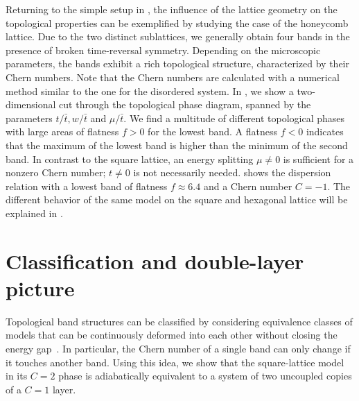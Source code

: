Returning to the simple setup in , the influence of the lattice geometry on the topological properties can be exemplified by studying the case of the honeycomb lattice.
Due to the two distinct sublattices, we generally obtain four bands in the presence of broken time-reversal symmetry.
Depending on the microscopic parameters, the bands exhibit a rich topological structure, characterized by their Chern numbers.
Note that the Chern numbers are calculated with a numerical method similar to the one for the disordered system.
In , we show a two-dimensional cut through the topological phase diagram, spanned by the parameters $t/\bar{t}, w/\bar{t}$ and $\mu/\bar{t}$.
We find a multitude of different topological phases with large areas of flatness $f > 0$ for the lowest band.
A flatness $f < 0$ indicates that the maximum of the lowest band is higher than the minimum of the second band.
In contrast to the square lattice, an energy splitting $\mu \ne 0$ is sufficient for a nonzero Chern number; $t\ne 0$ is not necessarily needed.
 shows the dispersion relation with a lowest band of flatness $f\approx 6.4$ and a Chern number $C=-1$.
The different behavior of the same model on the square and hexagonal lattice will be explained in .

\section{Classification and double-layer picture}


Topological band structures can be classified by considering equivalence classes of models that can be continuously deformed into each other without closing the energy gap~\cite{Hasan2010}.
In particular, the Chern number of a single band can only change if it touches another band.
Using this idea, we show that the square-lattice model in its $C=2$ phase is adiabatically equivalent to a system of two uncoupled copies of a $C=1$ layer.

